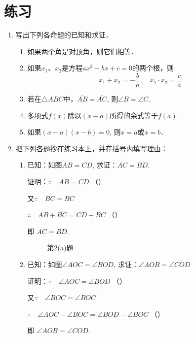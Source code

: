 \section*{练习}
\begin{enumerate}
	\item 写出下列各命题的已知和求证．
\begin{enumerate}
\item 如果两个角是对顶角，则它们相等．
\item 如果$x_1$、$x_2$是方程$ax^2+bx+c=0$的两个根，则
	$$x_1+x_2=-\frac{b}{a},\quad x_1\cdot x_2=\frac{c}{a}$$
	\item 若在$\triangle ABC$中，$\overline{AB}=\overline{AC}$, 则$\angle B=\angle C$.
	\item 多项式$f(x)$除以$(x-a)$所得的余式等于$f(a)$.
	\item 如果$(x-a)(x-b)=0$, 则$x=a$或$x=b$．
\end{enumerate}

\item 把下列各题抄在练习本上，并在括号内填写理由：
\begin{enumerate}
	\item 已知：如图$\overline{AB}=\overline{CD}$, 	求证：$\overline{AC}=\overline{BD}$.

	证明：$\because\quad \overline{AB}=\overline{CD}$ （\qquad）

	又$\because\quad \overline{BC}=\overline{BC}$

	$\therefore\quad \overline{AB}+\overline{BC}=\overline{CD}+\overline{BC}$ （\qquad）

	即 $\overline{AC}=\overline{BD}$.

\begin{figure}[htp]
	\centering
{}
	\caption{第2(a)题}
\end{figure}

\item 已知：如图$\angle AOC=\angle BOD$, 求证：$\angle AOB=\angle COD$

证明：$\because\quad \angle AOC=\angle BOD$ （\qquad）
	
又$\because\quad \angle BOC=\angle BOC$

$\therefore\quad \angle AOC-\angle BOC=\angle BOD-\angle BOC$ （\qquad ）

即 $\angle AOB=\angle COD$.


\end{enumerate}
\end{enumerate}
